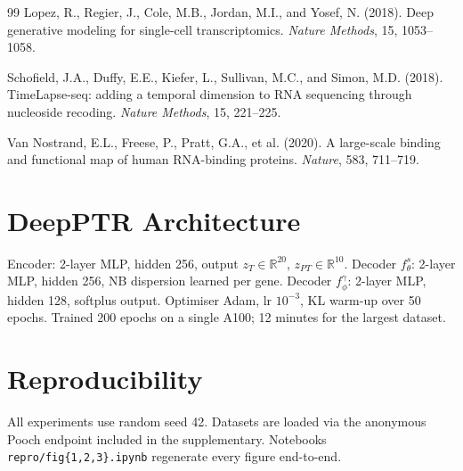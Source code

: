 \documentclass{article}
\begin{document}
\begin{thebibliography}{99}
Lopez, R., Regier, J., Cole, M.B., Jordan, M.I., and Yosef, N. (2018).
Deep generative modeling for single-cell transcriptomics.
\textit{Nature Methods}, 15, 1053--1058.

Schofield, J.A., Duffy, E.E., Kiefer, L., Sullivan, M.C., and Simon, M.D. (2018).
TimeLapse-seq: adding a temporal dimension to RNA sequencing through nucleoside recoding.
\textit{Nature Methods}, 15, 221--225.

Van Nostrand, E.L., Freese, P., Pratt, G.A., et al. (2020).
A large-scale binding and functional map of human RNA-binding proteins.
\textit{Nature}, 583, 711--719.

\end{thebibliography}

\appendix

\section{DeepPTR Architecture}
\label{sec:arch}

Encoder: 2-layer MLP, hidden 256, output $z_T \in \mathbb{R}^{20}$, $z_{PT} \in \mathbb{R}^{10}$. Decoder $f^s_\theta$: 2-layer MLP, hidden 256, NB dispersion learned per gene. Decoder $f^\gamma_\phi$: 2-layer MLP, hidden 128, softplus output. Optimiser Adam, lr $10^{-3}$, KL warm-up over 50 epochs. Trained 200 epochs on a single A100; 12 minutes for the largest dataset.

\section{Reproducibility}
\label{sec:repro}

All experiments use random seed 42. Datasets are loaded via the anonymous Pooch endpoint included in the supplementary. Notebooks \texttt{repro/fig\{1,2,3\}.ipynb} regenerate every figure end-to-end.
\end{document}
